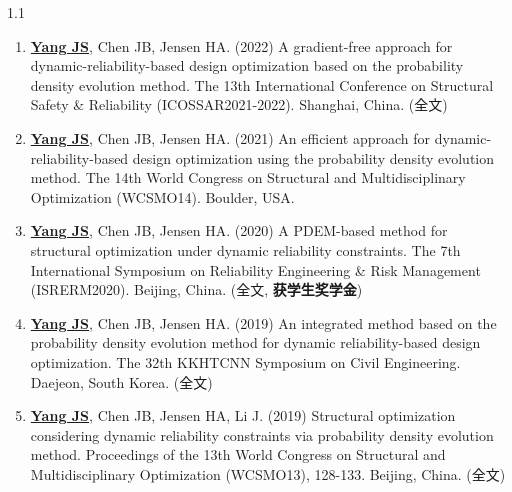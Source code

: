\documentclass{resume}
\begin{document}
\begin{spacing}{1.1}
\begin{enumerate}[itemsep=5pt,topsep=2pt]
  \item \underline{\textbf{Yang JS}}, Chen JB, Jensen HA. (2022) A gradient-free approach for dynamic-reliability-based design optimization based on the probability density evolution method. The 13th International Conference on Structural Safety \& Reliability (ICOSSAR2021-2022). Shanghai, China. (全文)

  \item \underline{\textbf{Yang JS}}, Chen JB, Jensen HA. (2021) An efficient approach for dynamic-reliability-based design optimization using the probability density evolution method. The 14th World Congress on Structural and Multidisciplinary Optimization (WCSMO14). Boulder, USA.

  \item \underline{\textbf{Yang JS}}, Chen JB, Jensen HA. (2020) A PDEM-based method for structural optimization under dynamic reliability constraints. The 7th International Symposium on Reliability Engineering \& Risk Management (ISRERM2020). Beijing, China. (全文, \textbf{获学生奖学金})

  \item \underline{\textbf{Yang JS}}, Chen JB, Jensen HA. (2019) An integrated method based on the probability density evolution method for dynamic reliability-based design optimization. The 32th KKHTCNN Symposium on Civil Engineering. Daejeon, South Korea. (全文)
  
  \item \underline{\textbf{Yang JS}}, Chen JB, Jensen HA, Li J. (2019) Structural optimization considering dynamic reliability constraints via probability density evolution method. Proceedings of the 13th World Congress on Structural and Multidisciplinary Optimization (WCSMO13), 128-133. Beijing, China. (全文)
\end{enumerate}
\end{spacing}
\end{document}
